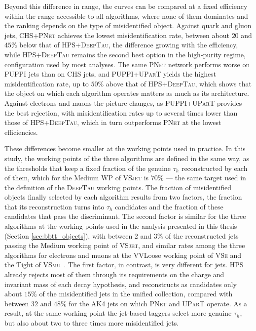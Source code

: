 Beyond this difference in range, the curves can be compared at a fixed efficiency within the range accessible to all algorithms, where none of them dominates and the ranking depends on the type of misidentified object. Against quark and gluon jets, CHS+\textsc{PNet} achieves the lowest misidentification rate, between about $20$ and $45\%$ below that of HPS+\textsc{DeepTau}, the difference growing with the efficiency, while HPS+\textsc{DeepTau} remains the second best option in the high-purity regime, configuration used by most analyses. The same \textsc{PNet} network performs worse on PUPPI jets than on CHS jets, and PUPPI+\textsc{UParT} yields the highest misidentification rate, up to $50\%$ above that of HPS+\textsc{DeepTau}, which shows that the object on which each algorithm operates matters as much as its architecture. Against electrons and muons the picture changes, as PUPPI+\textsc{UParT} provides the best rejection, with misidentification rates up to several times lower than those of HPS+\textsc{DeepTau}, which in turn outperforms \textsc{PNet} at the lowest efficiencies.

These differences become smaller at the working points used in practice. In this study, the working points of the three algorithms are defined in the same way, as the thresholds that keep a fixed fraction of the genuine $\tau_h$ reconstructed by each of them, which for the Medium WP of \textsc{VSjet} is $70\%$ — the same target used in the definition of the \textsc{DeepTau} working points. The fraction of misidentified objects finally selected by each algorithm results from two factors, the fraction that its reconstruction turns into $\tau_h$ candidates and the fraction of these candidates that pass the discriminant. The second factor is similar for the three algorithms at the working points used in the analysis presented in this thesis (Section \ref{sec:bbtt_objects}), with between $2$ and $3\%$ of the reconstructed jets passing the Medium working point of \textsc{VSjet}, and similar rates among the three algorithms for electrons and muons at the VVLoose working point of \textsc{VSe} and the Tight of \textsc{VSmu}~\cite{CMS-DP-2025-073}. The first factor, in contrast, is very different for jets. HPS already rejects most of them through its requirements on the charge and invariant mass of each decay hypothesis, and reconstructs as candidates only about $15\%$ of the misidentified jets in the unified collection, compared with between $32$ and $48\%$ for the AK4 jets on which \textsc{PNet} and \textsc{UParT} operate. As a result, at the same working point the jet-based taggers select more genuine $\tau_h$, but also about two to three times more misidentified jets.

